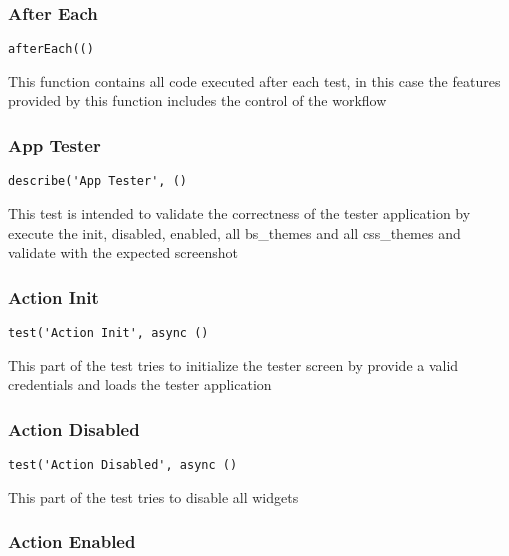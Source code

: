 \documentclass[a4paper]{article}
\begin{document}
\hypertarget{toc704}{}
\subsubsection{After Each}

\begin{lstlisting}
afterEach(()
\end{lstlisting}

This function contains all code executed after each test, in this case the
features provided by this function includes the control of the workflow

\hypertarget{toc705}{}
\subsubsection{App Tester}

\begin{lstlisting}
describe('App Tester', ()
\end{lstlisting}

This test is intended to validate the correctness of the tester application
by execute the init, disabled, enabled, all bs\_themes and all css\_themes and
validate with the expected screenshot

\hypertarget{toc706}{}
\subsubsection{Action Init}

\begin{lstlisting}
test('Action Init', async ()
\end{lstlisting}

This part of the test tries to initialize the tester screen by provide a
valid credentials and loads the tester application

\hypertarget{toc707}{}
\subsubsection{Action Disabled}

\begin{lstlisting}
test('Action Disabled', async ()
\end{lstlisting}

This part of the test tries to disable all widgets

\hypertarget{toc708}{}
\subsubsection{Action Enabled}
\end{document}
